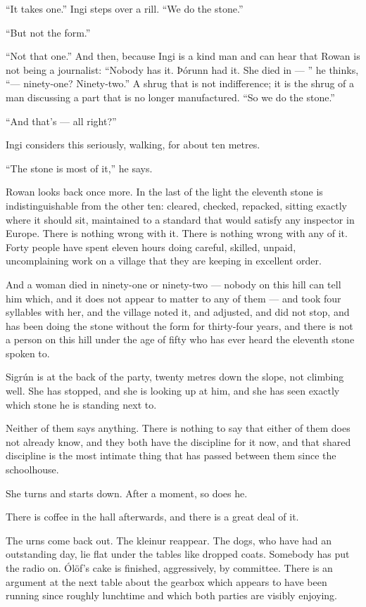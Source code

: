 \documentclass[11pt,oneside]{book}
\newcommand{\sceneline}{%
  \par\vspace{1.2em}
  \begin{center}
    \fontsize{11}{11}\selectfont \textbullet\quad\textbullet\quad\textbullet
  \end{center}
  \vspace{0.6em}\noindent\ignorespaces
}
\begin{document}
``It takes one.'' Ingi steps over a rill. ``We do the stone.''

``But not the form.''

``Not that one.'' And then, because Ingi is a kind man and can hear that
Rowan is not being a journalist: ``Nobody has it. Þórunn had it. She
died in --- '' he thinks, ``--- ninety-one? Ninety-two.'' A shrug that
is not indifference; it is the shrug of a man discussing a part that is
no longer manufactured. ``So we do the stone.''

``And that's --- all right?''

Ingi considers this seriously, walking, for about ten metres.

``The stone is most of it,'' he says.

Rowan looks back once more. In the last of the light the eleventh stone
is indistinguishable from the other ten: cleared, checked, repacked,
sitting exactly where it should sit, maintained to a standard that would
satisfy any inspector in Europe. There is nothing wrong with it. There
is nothing wrong with any of it. Forty people have spent eleven hours
doing careful, skilled, unpaid, uncomplaining work on a village that
they are keeping in excellent order.

And a woman died in ninety-one or ninety-two --- nobody on this hill can
tell him which, and it does not appear to matter to any of them --- and
took four syllables with her, and the
village noted it, and adjusted, and did not stop, and has been doing the
stone without the form for thirty-four years, and there is not a person
on this hill under the age of fifty who has ever heard the eleventh
stone spoken to.

Sigrún is at the back of the party, twenty metres down the slope, not
climbing well. She has stopped, and she is looking up at him, and she
has seen exactly which stone he is standing next to.

Neither of them says anything. There is nothing to say that either of
them does not already know, and they both have the discipline for it
now, and that shared discipline is the most intimate thing that has
passed between them since the schoolhouse.

She turns and starts down. After a moment, so does he.

\sceneline

There is coffee in the hall afterwards, and there is a great deal of it.

The urns come back out. The kleinur reappear. The dogs, who have had an
outstanding day, lie flat under the tables like dropped coats. Somebody
has put the radio on. Ólöf's cake is finished, aggressively, by
committee. There is an argument at the next table about the gearbox
which appears to have been running since roughly lunchtime and which
both parties are visibly enjoying.
\end{document}
